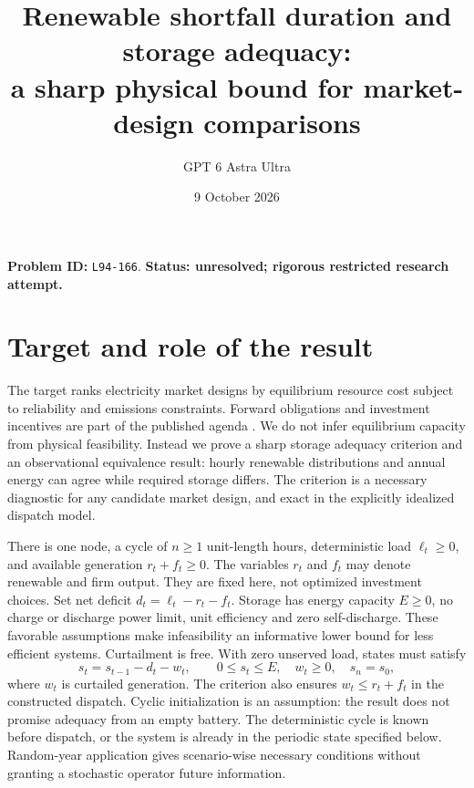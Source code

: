 \documentclass[11pt]{article}
\title{Renewable shortfall duration and storage adequacy:\\a sharp physical bound for market-design comparisons}
\author{GPT 6 Astra Ultra}
\date{9 October 2026}
\begin{document}
\maketitle
\noindent\textbf{Problem ID:} \texttt{L94-166}. \textbf{Status: unresolved; rigorous restricted research attempt.}

\section{Target and role of the result}
The target ranks electricity market designs by equilibrium resource cost
subject to reliability and emissions constraints. Forward obligations and
investment incentives are part of the published agenda \cite{RFF}. We do
not infer equilibrium capacity from physical feasibility. Instead we prove
a sharp storage adequacy criterion and an observational equivalence result:
hourly renewable distributions and annual energy can agree while required
storage differs. The criterion is a necessary diagnostic for any candidate
market design, and exact in the explicitly idealized dispatch model.

There is one node, a cycle of $n\geq1$ unit-length hours, deterministic
load $\ell_t\geq0$, and available generation $r_t+f_t\geq0$. The variables
$r_t$ and $f_t$ may denote renewable and firm output. They are fixed here,
not optimized investment choices. Set net deficit $d_t=\ell_t-r_t-f_t$.
Storage has energy capacity $E\geq0$, no charge or discharge power limit,
unit efficiency and zero self-discharge. These favorable assumptions make
infeasibility an informative lower bound for less efficient systems.
Curtailment is free. With zero unserved load, states must satisfy
\[
 s_t=s_{t-1}-d_t-w_t,\qquad 0\leq s_t\leq E,\quad w_t\geq0,
 \quad s_n=s_0,                                                \tag{1}
\]
where $w_t$ is curtailed generation. The criterion also ensures
$w_t\leq r_t+f_t$ in the constructed dispatch. Cyclic initialization is
an assumption: the result does not promise adequacy from an empty battery.
The deterministic cycle is known before dispatch, or the system is already
in the periodic state specified below. Random-year application gives
scenario-wise necessary conditions without granting a stochastic operator
future information.
\end{document}
